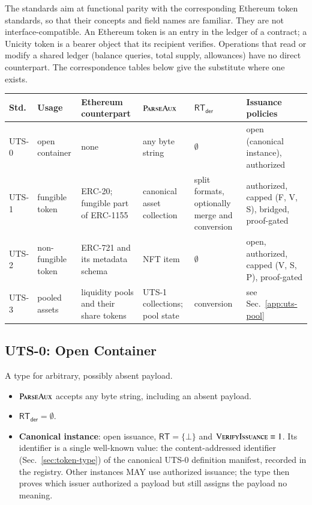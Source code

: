 The standards aim at functional parity with the corresponding Ethereum token standards, so that their concepts and field names are familiar. They are not interface-compatible. An Ethereum token is an entry in the ledger of a contract; a Unicity token is a bearer object that its recipient verifies. Operations that read or modify a shared ledger (balance queries, total supply, allowances) have no direct counterpart. The correspondence tables below give the substitute where one exists.

\begin{longtable}{>{\raggedright\arraybackslash}p{1.1cm}>{\raggedright\arraybackslash}p{1.9cm}>{\raggedright\arraybackslash}p{2.3cm}>{\raggedright\arraybackslash}p{2.3cm}>{\raggedright\arraybackslash}p{2.3cm}>{\raggedright\arraybackslash}p{3.0cm}}
\textbf{Std.} & \textbf{Usage} & \textbf{Ethereum counterpart} & $\Call{ParseAux}{}$ & $\mathsf{RT}_\mathsf{der}$ & \textbf{Issuance policies} \\
\hline
\endhead
UTS-0 & open container & none & any byte string & $\emptyset$ & open (canonical instance), authorized \\
UTS-1 & fungible token & ERC-20; fungible part of ERC-1155 & canonical asset collection & split formats, optionally merge and conversion & authorized, capped (F, V, S), bridged, proof-gated \\
UTS-2 & non-fungible token & ERC-721 and its metadata schema & NFT item & $\emptyset$ & open, authorized, capped (V, S, P), proof-gated \\
UTS-3 & pooled assets & liquidity pools and their share tokens & UTS-1 collections; pool state & conversion & see Sec.~\ref{app:uts-pool} \\
\end{longtable}

\subsection{UTS-0: Open Container}\label{app:uts-blank}

A type for arbitrary, possibly absent payload.

\begin{itemize}
	\item $\Call{ParseAux}{}$ accepts any byte string, including an absent payload.
	\item $\mathsf{RT}_\mathsf{der} = \emptyset$.
	\item \textbf{Canonical instance}: open issuance, $\mathsf{RT} = \{\bot\}$ and $\Call{VerifyIssuance}{} \equiv 1$. Its identifier is a single well-known value: the content-addressed identifier (Sec.~\ref{sec:token-type}) of the canonical UTS-0 definition manifest, recorded in the registry. Other instances MAY use authorized issuance; the type then proves which issuer authorized a payload but still assigns the payload no meaning.
\end{itemize}

